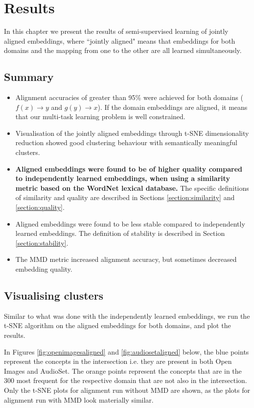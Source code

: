 \chapter{Results}

In this chapter we present the results of semi-supervised learning of jointly aligned embeddings, where ``jointly aligned" means that embeddings for both domains and the mapping from one to the other are all learned simultaneously. 


\section{Summary}
\begin{itemize}
    \item Alignment accuracies of greater than 95\% were achieved for both domains ($f(x) \rightarrow y$ and $g(y) \rightarrow x$). If the domain embeddings are aligned, it means that our multi-task learning problem is well constrained. 
    \item Visualisation of the jointly aligned embeddings through t-SNE dimensionality reduction showed good clustering behaviour with semantically meaningful clusters.
    \item \textbf{Aligned embeddings were found to be of higher quality compared to independently learned embeddings, when using a similarity metric based on the WordNet lexical database.} The specific definitions of similarity and quality are described in Sections \ref{section:similarity} and \ref{section:quality}.
    \item Aligned embeddings were found to be less stable compared to independently learned embeddings. The definition of stability is described in Section \ref{section:stability}.
    \item The MMD metric increased alignment accuracy, but sometimes decreased embedding quality. 
\end{itemize}

\section{Visualising clusters}
Similar to what was done with the independently learned embeddings, we run the t-SNE algorithm on the aligned embeddings for both domains, and plot the results.

In Figures \ref{fig:openimagesaligned} and \ref{fig:audiosetaligned} below, the blue points represent the concepts in the intersection i.e. they are present in both Open Images and AudioSet. The orange points represent the concepts that are in the 300 most frequent for the respective domain that are not also in the intersection. Only the t-SNE plots for alignment run without MMD are shown, as the plots for alignment run with MMD look materially similar. 

